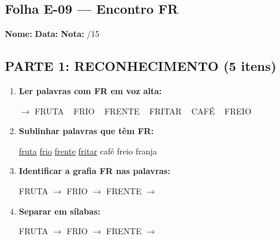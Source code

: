 \subsection{Folha E-09 --- Encontro FR}
\begin{exercicio}



\noindent\textbf{Nome:} \underline{\hspace{3.2cm}} \quad \textbf{Data:} \underline{\hspace{1.6cm}} \quad \textbf{Nota:} \underline{\hspace{0.9cm}}/15


\subsection*{PARTE 1: RECONHECIMENTO (5 itens)}

\begin{enumerate}

  \item \textbf{Ler palavras com FR em voz alta:}
  \begin{center}
  $\rightarrow$ FRUTA ~ FRIO ~ FRENTE ~ FRITAR ~ CAFÉ ~ FREIO
  \end{center}

  \item \textbf{Sublinhar palavras que têm FR:}

\begin{center}
  \uline{fruta} \quad \uline{frio} \quad \uline{frente} \quad \uline{fritar} \quad café \quad freio \quad franja
\end{center}

  \item \textbf{Identificar a grafia FR nas palavras:}
  \begin{center}
  FRUTA $\rightarrow$ \underline{\hspace{1cm}} \quad FRIO $\rightarrow$ \underline{\hspace{1cm}} \quad FRENTE $\rightarrow$ \underline{\hspace{1cm}}
  \end{center}

  \item \textbf{Separar em sílabas:}
  \begin{center}
  FRUTA $\rightarrow$ \underline{\hspace{1.2cm}} \quad FRIO $\rightarrow$ \underline{\hspace{1.2cm}} \quad FRENTE $\rightarrow$ \underline{\hspace{1.2cm}}
  \end{center}


\end{enumerate}
\end{exercicio}
